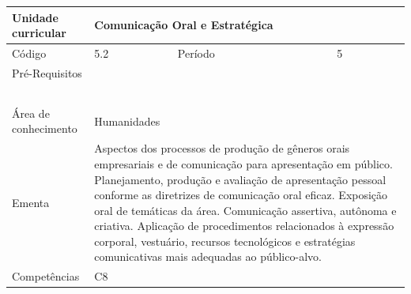 \clearpage
\newpage

\begin{quadro}[ht!]
  \centering\scriptsize
\caption{Unidade Curricular Comunicação Oral e Estratégica}

\begin{tabular}{|p{2.5cm}|p{2.5cm}|p{2.5cm}|p{2.5cm}|p{2.5cm}|}\hline

  Unidade curricular & \multicolumn{4}{p{10cm}|}{ Comunicação Oral e Estratégica }\\\hline
  Código & 5.2 & Período & \multicolumn{2}{p{5cm}|}{ 5 }\\\hline
  Pré-Requisitos & \multicolumn{4}{p{10cm}|}{  } \\\hline
  \cellcolor{blue1}{ CH PRESENCIAL } &
    \cellcolor{blue1}{CH EAD Síncrona} &
    \cellcolor{blue1}{CH EAD Síncrona Mediada} &
    \cellcolor{blue1}{CH EAD Assíncrona} &
    \cellcolor{blue1}{CH APCC} \\\hline
  \cellcolor{blue1}{ 30 } &
    \cellcolor{blue1}{ 0 } &
    \cellcolor{blue1}{ 0 } &
    \cellcolor{blue1}{ 0 } &
    \cellcolor{blue1}{0} \\\hline
  \cellcolor{blue1}{ CH Teórica } &
    \cellcolor{blue1}{CH Prática} &
    \cellcolor{blue1}{CH Humanidades} &
    \cellcolor{blue1}{CH Extensão} &
    \cellcolor{blue1}{CH EAD TOTAL} \\\hline
  \cellcolor{blue1}{ 15 } &
    \cellcolor{blue1}{ 15 } &
    \cellcolor{blue1}{ 30 } &
    \cellcolor{blue1}{ 0 } &
    \cellcolor{blue1}{ 0 } \\\hline
  \cellcolor{blue1}{CARGA-HORÁRIA TOTAL} & \multicolumn{4}{p{10cm}|}{ \cellcolor{blue1}{ 30 } } \\\hline
  Área de conhecimento & \multicolumn{4}{p{10cm}|}{ Humanidades } \\\hline
  Ementa & \multicolumn{4}{p{10cm}|}{ Aspectos dos processos de produção de gêneros orais empresariais e de comunicação para apresentação em público. Planejamento, produção e avaliação de apresentação pessoal conforme as diretrizes de comunicação oral eficaz. Exposição oral de temáticas da área. Comunicação assertiva, autônoma e criativa. Aplicação de procedimentos relacionados à expressão corporal, vestuário, recursos tecnológicos e estratégias comunicativas mais adequadas ao público-alvo. } \\\hline
  Competências & \multicolumn{4}{p{10cm}|}{ C8 } \\\hline


  
	\end{tabular}

\end{quadro}


